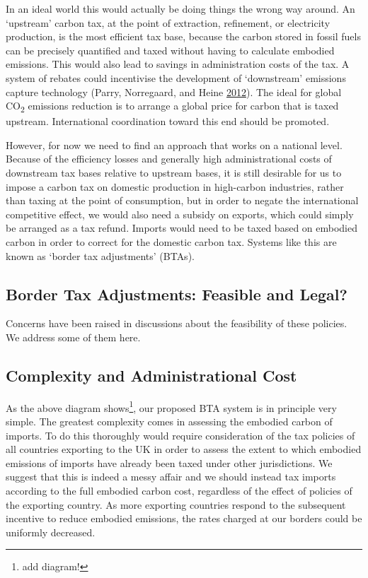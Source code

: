 \documentclass[]{tufte-handout}
\begin{document}
In an ideal world this would actually be doing things the wrong way
around. An `upstream' carbon tax, at the point of extraction,
refinement, or electricity production, is the most efficient tax base,
because the carbon stored in fossil fuels can be precisely quantified
and taxed without having to calculate embodied emissions. This would
also lead to savings in administration costs of the tax. A system of
rebates could incentivise the development of `downstream' emissions
capture technology (Parry, Norregaard, and Heine
\protect\hyperlink{ref-Parry2012}{2012}). The ideal for global
CO\textsubscript{2} emissions reduction is to arrange a global price for
carbon that is taxed upstream. International coordination toward this
end should be promoted.

However, for now we need to find an approach that works on a national
level. Because of the efficiency losses and generally high
administrational costs of downstream tax bases relative to upstream
bases, it is still desirable for us to impose a carbon tax on domestic
production in high-carbon industries, rather than taxing at the point of
consumption, but in order to negate the international competitive
effect, we would also need a subsidy on exports, which could simply be
arranged as a tax refund. Imports would need to be taxed based on
embodied carbon in order to correct for the domestic carbon tax. Systems
like this are known as `border tax adjustments' (BTAs).

\hypertarget{border-tax-adjustments-feasible-and-legal}{%
\subsection{Border Tax Adjustments: Feasible and
Legal?}\label{border-tax-adjustments-feasible-and-legal}}

Concerns have been raised in discussions about the feasibility of these
policies. We address some of them here.

\hypertarget{complexity-and-administrational-cost}{%
\subsection{Complexity and Administrational
Cost}\label{complexity-and-administrational-cost}}

As the above diagram shows\footnote{add diagram!}, our proposed BTA
system is in principle very simple. The greatest complexity comes in
assessing the embodied carbon of imports. To do this thoroughly would
require consideration of the tax policies of all countries exporting to
the UK in order to assess the extent to which embodied emissions of
imports have already been taxed under other jurisdictions. We suggest
that this is indeed a messy affair and we should instead tax imports
according to the full embodied carbon cost, regardless of the effect of
policies of the exporting country. As more exporting countries respond
to the subsequent incentive to reduce embodied emissions, the rates
charged at our borders could be uniformly decreased.
\end{document}
